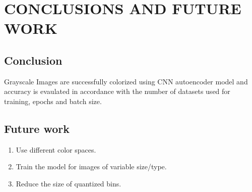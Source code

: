 \documentclass[12pt]{report}	%
\begin{document}
\chapter{CONCLUSIONS AND FUTURE WORK}
\section{Conclusion}
Grayscale Images are successfully colorized using CNN autoencoder model and accuracy is evaulated in accordance with the number of datasets used for training, epochs and batch size.


\section{Future work}
\begin{enumerate}
	\item	Use different color spaces. 
        \item Train the model for images of variable size/type.
        \item Reduce the size of quantized bins.
	
\end{enumerate}

\newpage
\end{document}
